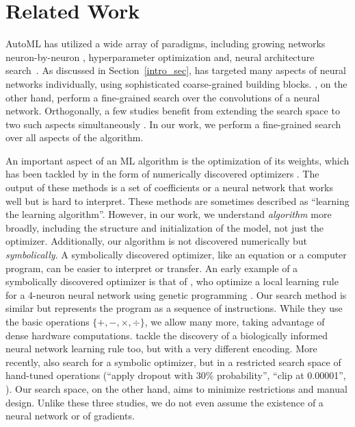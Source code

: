\section{Related Work}

AutoML has utilized a wide array of paradigms, including growing networks neuron-by-neuron \cite{stanley2002evolving}, hyperparameter optimization \cite{snoek2012practical,loshchilov2016cma,jaderberg2017population} and, neural architecture search~\cite{zoph2016neural,real2017large}.  As discussed in Section~\ref{intro_sec}, \aml has targeted many aspects of neural networks individually, using sophisticated coarse-grained building blocks. , on the other hand, perform a fine-grained search over the convolutions of a neural network. Orthogonally, a few studies benefit from extending the search space to two such aspects simultaneously \cite{zela2018towards,miikkulainen2019evolving,noy2019asap}. In our work, we perform a fine-grained search over all aspects of the algorithm. 

An important aspect of an ML algorithm is the optimization of its weights, which has been tackled by \aml in the form of numerically discovered optimizers \cite{chalmers1991evolution,andrychowicz2016learning,vanschoren2018meta}. The output of these methods is a set of coefficients or a neural network that works well but is hard to interpret. These methods are sometimes described as ``learning the learning algorithm''. However, in our work, we understand \textit{algorithm} more broadly, including the structure and initialization of the model, not just the optimizer. Additionally, our algorithm is not discovered numerically but \textit{symbolically}. A symbolically discovered optimizer, like an equation or a computer program, can be easier to interpret or transfer. An early example of a symbolically discovered optimizer is that of , who optimize a local learning rule for a 4-neuron neural network using genetic programming \cite{holland1975adaptation,forsyth1981beagle,koza1992genetic}. Our search method is similar but represents the program as a sequence of instructions. While they use the basic operations $\{+, -, \times, \div\}$, we allow many more, taking advantage of dense hardware computations. \citet{risi2010indirectly} tackle the discovery of a biologically informed neural network learning rule too, but with a very different encoding. More recently,  also search for a symbolic optimizer, but in a restricted search space of hand-tuned operations (\eg ``apply dropout with 30\% probability'', ``clip at 0.00001'', \etc). Our search space, on the other hand, aims to minimize restrictions and manual design. Unlike these three studies, we do not even assume the existence of a neural network or of gradients.

